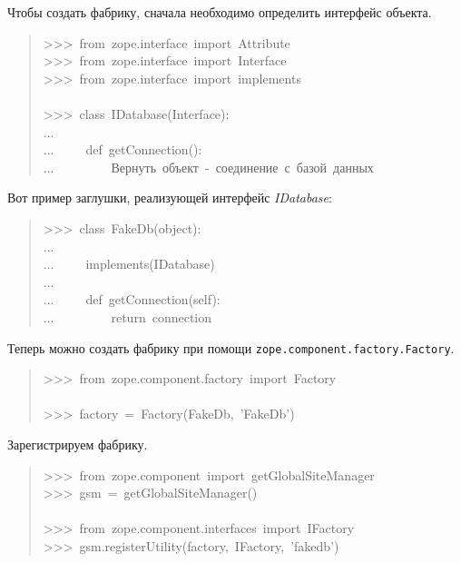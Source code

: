 \documentclass[14pt,a4paper,openany,twoside,final]{extbook}
\providecommand*{\DUroletitlereference}[1]{\textsl{#1}}
\begin{document}
Чтобы создать фабрику, сначала необходимо определить интерфейс
объекта.

\begin{quote}{\ttfamily \raggedright \noindent
>{}>{}>~from~zope.interface~import~Attribute\\
>{}>{}>~from~zope.interface~import~Interface\\
>{}>{}>~from~zope.interface~import~implements\\
~\\
>{}>{}>~class~IDatabase(Interface):\\
...\\
...~~~~~def~getConnection():\\
...~~~~~~~~~\textquotedbl{}\textquotedbl{}\textquotedbl{}Вернуть~объект~-~соединение~с~базой~данных\textquotedbl{}\textquotedbl{}\textquotedbl{}
}
\end{quote}

Вот пример заглушки, реализующей интерфейс \DUroletitlereference{IDatabase}:

\begin{quote}{\ttfamily \raggedright \noindent
>{}>{}>~class~FakeDb(object):\\
...\\
...~~~~~implements(IDatabase)\\
...\\
...~~~~~def~getConnection(self):\\
...~~~~~~~~~return~\textquotedbl{}connection\textquotedbl{}
}
\end{quote}

Теперь можно создать фабрику при помощи
\texttt{zope.component.factory.Factory}.

\begin{quote}{\ttfamily \raggedright \noindent
>{}>{}>~from~zope.component.factory~import~Factory\\
~\\
>{}>{}>~factory~=~Factory(FakeDb,~'FakeDb')
}
\end{quote}

Зарегистрируем фабрику.

\begin{quote}{\ttfamily \raggedright \noindent
>{}>{}>~from~zope.component~import~getGlobalSiteManager\\
>{}>{}>~gsm~=~getGlobalSiteManager()\\
~\\
>{}>{}>~from~zope.component.interfaces~import~IFactory\\
>{}>{}>~gsm.registerUtility(factory,~IFactory,~'fakedb')
}
\end{quote}
\end{document}
